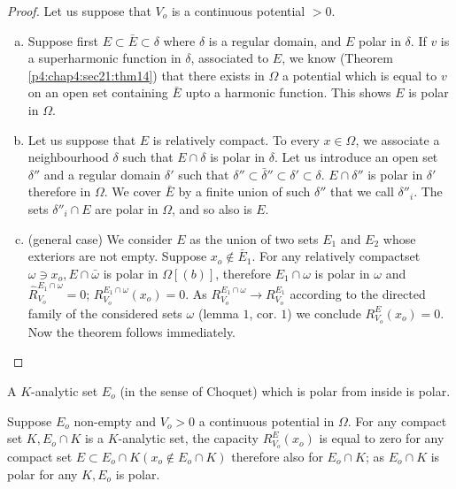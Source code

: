 \begin{proof}
  Let us suppose that $V_o$ is a continuous potential $> 0$. 
  \begin{enumerate} [a)]
  \item Suppose first $E \subset \bar{E} \subset \delta$ where
    $\delta$ is a regular domain, and $E$ polar in $\delta$. If $v$ is
    a superharmonic function in $\delta$, associated to $E$, we know
    (Theorem \ref{p4:chap4:sec21:thm14}) that there exists in $\Omega$ a potential which is
    equal to $v$ on an open set containing $\bar{E}$ upto a harmonic
    function. This shows $E$ is polar in $\Omega$. 
  \item Let us suppose that $E$ is relatively compact. To every $x \in
    \Omega$, we associate a neighbourhood $\delta$ such that $E \cap
    \delta$ is polar in $\delta$. Let us introduce an open set
    $\delta''$ and a regular domain $\delta'$ such that $\delta''
    \subset \bar{\delta}''\subset \delta' \subset \delta$. $E \cap
    \delta''$ is polar in $\delta'$ therefore in $\Omega$. We cover
    $\bar{E}$ by a finite union of such $\delta''$ that we call
    $\delta''_i$. The sets $\delta''_i \cap E$ are polar in $\Omega$,
    and so also is $E$. 
  \item (general case) We consider $E$ as the union of two sets $E_1$
    and $E_2$ whose exteriors are not empty. Suppose $x_o \notin
    \bar{E}_1$. For any relatively compact\pageoriginale set $\omega \ni x_o, E \cap
    \bar{\omega}$ is polar in $\Omega [(b)]$, therefore $E_1 \cap
    \omega$ is polar in $\omega$ and $\hat{R}^{E_1 \cap \omega}_{V_o}
    = 0 $; $R^{E_1 \cap \omega}_{V_o} (x_o) = 0$. As $R^{E_1 \cap
      \omega}_{V_o} \to R^{E_1}_{V_o}$ according to the directed
    family of the considered sets $\omega$ (lemma $1$, cor. $1$) we
    conclude $R^E_{V_o}(x_o) = 0$. Now the theorem follows
    immediately. 
  \end{enumerate}
\end{proof}

\begin{prop}\label{p4:chap7:sec33:prop22} %
  A $K$-analytic set $E_o$ (in the sense of Choquet) which is polar from
  inside is polar. 
\end{prop}

Suppose $E_o$ non-empty and $V_o > 0$ a continuous potential in
$\Omega$. For any compact set $K, E_o \cap K$ is a $K$-analytic set, the
capacity $R^E_{V_o}(x_o)$ is equal to zero for any compact set $E
\subset E_o \cap K (x_o \notin E_o \cap K)$ therefore also for $E_o
\cap K $; as $E_o \cap K$ is polar for any $K, E_o$ is polar. 

